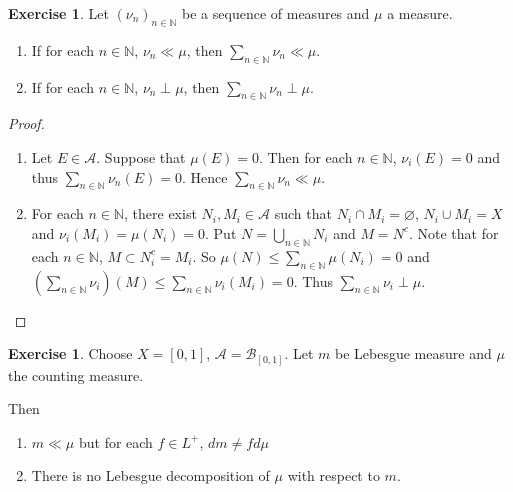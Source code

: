 \documentclass[12pt]{amsart}
\theoremstyle{definition}
\newtheorem{ex}[definition]{Exercise}
\newcommand{\N}{\mathbb{N}}
\newcommand{\MA}{\mathcal{A}}
\newcommand{\MB}{\mathcal{B}}
\begin{document}
	\begin{ex}
		Let $(\nu_n)_{n \in \N}$ be a sequence of measures and $\mu$ a measure. 
		\begin{enumerate}
			\item If for each $n \in \N$, $\nu_n \ll \mu$, then $\sum_{n \in \N} \nu_n \ll \mu$. 
			\item If for each $n \in \N$, $\nu_n \perp \mu$, then $\sum_{n \in \N} \nu_n \perp \mu$.
		\end{enumerate} 
	\end{ex}
	
	\begin{proof}
		\begin{enumerate}
			\item Let $E \in \MA$. Suppose that $\mu(E) = 0$. Then for each $n \in \N$, $\nu_i(E) = 0$ and thus $\sum_{n \in \N} \nu_n(E) = 0$. Hence $\sum_{n \in \N} \nu_n \ll \mu$.
			\item For each $n \in \N$, there exist $N_i, M_i \in \MA$ such that $N_i \cap M_i = \varnothing$, $N_i \cup M_i = X$ and $\nu_i(M_i) = \mu(N_i) = 0$. Put $N = \bigcup_{n \in \N} N_i$ and $M = N^c$. Note that for each $n \in \N$, $M \subset N_i^c = M_i$. So $\mu(N) \leq \sum_{n \in \N} \mu(N_i) = 0$ and $(\sum_{n \in \N} \nu_i) (M) \leq \sum_{n \in \N} \nu_i(M_i) = 0$. Thus $\sum_{n \in \N} \nu_i \perp \mu$.
		\end{enumerate}
	\end{proof}
	
	
	\begin{ex}
		Choose $X = [0,1]$, $\MA = \MB_{[0,1]}$. Let $m$ be Lebesgue measure and $\mu$ the counting measure. 
		
		Then 
		\begin{enumerate}
			\item $m \ll \mu$ but for each $f \in L^+$, $dm \neq f d\mu$
			\item There is no Lebesgue decomposition of $\mu$ with respect to $m$.
		\end{enumerate}
	\end{ex}
	
\end{document}
